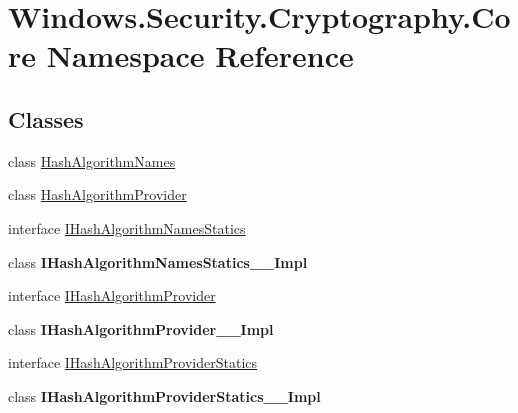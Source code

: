 \hypertarget{namespace_windows_1_1_security_1_1_cryptography_1_1_core}{}\section{Windows.\+Security.\+Cryptography.\+Core Namespace Reference}
\label{namespace_windows_1_1_security_1_1_cryptography_1_1_core}
\subsection*{Classes}
\begin{DoxyCompactItemize}
\item 
class \hyperlink{class_windows_1_1_security_1_1_cryptography_1_1_core_1_1_hash_algorithm_names}{Hash\+Algorithm\+Names}
\item 
class \hyperlink{class_windows_1_1_security_1_1_cryptography_1_1_core_1_1_hash_algorithm_provider}{Hash\+Algorithm\+Provider}
\item 
interface \hyperlink{interface_windows_1_1_security_1_1_cryptography_1_1_core_1_1_i_hash_algorithm_names_statics}{I\+Hash\+Algorithm\+Names\+Statics}
\item 
class {\bfseries I\+Hash\+Algorithm\+Names\+Statics\+\_\+\+\_\+\+Impl}
\item 
interface \hyperlink{interface_windows_1_1_security_1_1_cryptography_1_1_core_1_1_i_hash_algorithm_provider}{I\+Hash\+Algorithm\+Provider}
\item 
class {\bfseries I\+Hash\+Algorithm\+Provider\+\_\+\+\_\+\+Impl}
\item 
interface \hyperlink{interface_windows_1_1_security_1_1_cryptography_1_1_core_1_1_i_hash_algorithm_provider_statics}{I\+Hash\+Algorithm\+Provider\+Statics}
\item 
class {\bfseries I\+Hash\+Algorithm\+Provider\+Statics\+\_\+\+\_\+\+Impl}
\end{DoxyCompactItemize}
